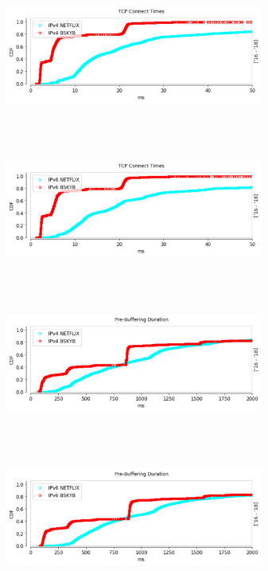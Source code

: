 \begin{figure}
	\centering
	\begin{minipage}{0.5\textwidth}
		\centering
		\includegraphics[keepaspectratio, height=5cm, width=8.5cm]{figures/cache/bskyb/netflix-syn-time-separate-bskyb-v4.pdf}
	\end{minipage}
	\begin{minipage}{0.5\textwidth}
		\centering
		\includegraphics[keepaspectratio, height=5cm, width=8.5cm]{figures/cache/bskyb/netflix-syn-time-separate-bskyb-v6.pdf}
	\end{minipage}
	\begin{minipage}{0.5\textwidth}
		\centering
		\includegraphics[keepaspectratio, height=5cm, width=8.5cm]{figures/cache/bskyb/netflix-prebuffering-duration-separate-bskyb-v4.pdf}
	\end{minipage}
	\begin{minipage}{0.5\textwidth}
		\centering
		\includegraphics[keepaspectratio, height=5cm, width=8.5cm]{figures/cache/bskyb/netflix-prebuffering-duration-separate-bskyb-v6.pdf}

\end{minipage}
\end{figure}
